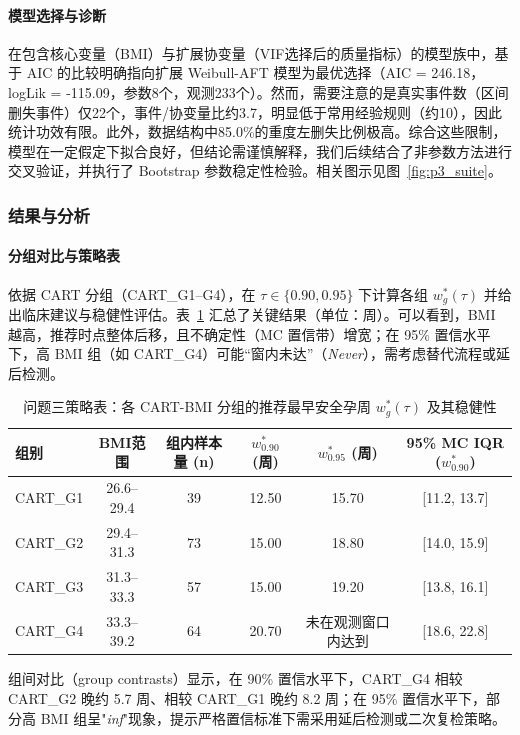 \documentclass[withoutpreface]{cumcmthesis}
\begin{document}
\paragraph{模型选择与诊断}
在包含核心变量（BMI）与扩展协变量（VIF选择后的质量指标）的模型族中，基于 AIC 的比较明确指向扩展 Weibull-AFT 模型为最优选择（AIC = 246.18，logLik = -115.09，参数8个，观测233个）。然而，需要注意的是真实事件数（区间删失事件）仅22个，事件/协变量比约3.7，明显低于常用经验规则（约10），因此统计功效有限。此外，数据结构中85.0\%的重度左删失比例极高。综合这些限制，模型在一定假定下拟合良好，但结论需谨慎解释，我们后续结合了非参数方法进行交叉验证，并执行了 Bootstrap 参数稳定性检验。相关图示见图~\ref{fig:p3_suite}。

\subsubsection{结果与分析}
\paragraph{分组对比与策略表} 依据 CART 分组（CART\_G1–G4），在 $\tau\in\{0.90,0.95\}$ 下计算各组 $w^{*}_g(\tau)$ 并给出临床建议与稳健性评估。表~\ref{tab:p3_policy_revised} 汇总了关键结果（单位：周）。可以看到，BMI 越高，推荐时点整体后移，且不确定性（MC 置信带）增宽；在 95\% 置信水平下，高 BMI 组（如 CART\_G4）可能“窗内未达”（\emph{Never}），需考虑替代流程或延后检测。

\begin{table}[htbp]
  \centering
  \caption{问题三策略表：各 CART-BMI 分组的推荐最早安全孕周 $w^{*}_g(\tau)$ 及其稳健性}
  \label{tab:p3_policy_revised}
  \begin{tabular}{@{}lccccc@{}}
    \toprule
    组别 & BMI范围 & 组内样本量 (n) & $w^{*}_{0.90}$ (周) & $w^{*}_{0.95}$ (周) & 95\% MC IQR ($w^{*}_{0.90}$) \\
    \midrule
    CART\_G1 & 26.6--29.4 & 39 & 12.50 & 15.70 & [11.2, 13.7] \\
    CART\_G2 & 29.4--31.3 & 73 & 15.00 & 18.80 & [14.0, 15.9] \\
    CART\_G3 & 31.3--33.3 & 57 & 15.00 & 19.20 & [13.8, 16.1] \\
    CART\_G4 & 33.3--39.2 & 64 & 20.70 & 未在观测窗口内达到 & [18.6, 22.8] \\
    \bottomrule
  \end{tabular}
\end{table}

组间对比（group contrasts）显示，在 90\% 置信水平下，CART\_G4 相较 CART\_G2 晚约 \num{5.7} 周、相较 CART\_G1 晚约 \num{8.2} 周；在 95\% 置信水平下，部分高 BMI 组呈"\textit{inf}"现象，提示严格置信标准下需采用延后检测或二次复检策略。
\end{document}
